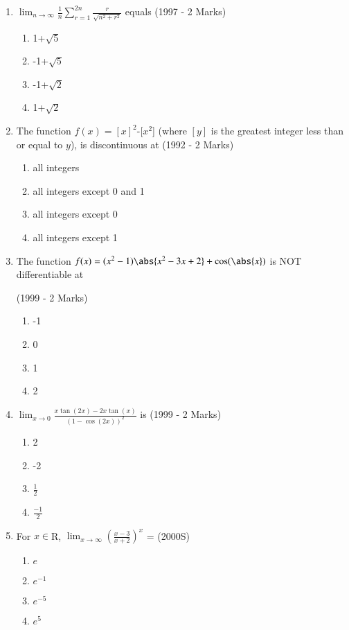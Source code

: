 \documentclass[journal,12pt,twocolumn]{IEEEtran}
\theoremstyle{remark}
\begin{document}
\begin{enumerate}[start=2]
\item $\lim_{n\to \infty}\frac{1}{n}\sum_{r=1}^{2n}\frac{r}{\sqrt{n^2+r^2}}$ equals
\hfill(1997 - 2 Marks)
  \begin{enumerate}
      \item 1+$\sqrt{5}$
      \item -1+$\sqrt{5}$
      \item -1+$\sqrt{2}$
      \item 1+$\sqrt{2}$
      
  \end{enumerate}

\item The function $f(x)=[x]^2$-[$x^2$] (where $[y]$ is the greatest integer less than or equal to $y$), is discontinuous at
\hfill(1992 - 2 Marks)
     \begin{enumerate}
         \item all integers
         \item all integers except 0 and 1
         \item all integers except 0
         \item all integers except 1
         
     \end{enumerate}

\item The function $f(x)=(x^2-1)\abs{x^2-3x+2}+\cos(\abs{x})$ is NOT differentiable at

  \hfill(1999 - 2 Marks)
     \begin{enumerate}
         \item -1
         \item 0
         \item 1
         \item 2
         
     \end{enumerate}

\item $\lim_{x\to0}$$\frac{x\tan(2x)-2x\tan(x)}{(1-\cos(2x))^2}$ is
  \hfill(1999 - 2 Marks)
    \begin{enumerate}
        \item 2
        
        \item -2

        \item $\frac{1}{2}$
        
        \item $\frac{-1}{2}$
        
    \end{enumerate}

\item For $x\in$R, $\lim_{x\to \infty}(\frac{x-3}{x+2})^x$ =
 \hfill(2000S)
   \begin{enumerate}
       \item $e$
       \item $e^{-1}$
       \item $e^{-5}$
       \item $e^{5}$
       
   \end{enumerate}

\end{enumerate}
\end{document}
